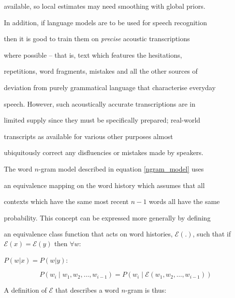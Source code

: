 available, so local estimates may need smoothing with global priors.


In addition, if language models are to be used for speech recognition


then it is good to train them on {\it precise} acoustic transcriptions


where possible -- that is, text which features the hesitations,


repetitions, word fragments, mistakes and all the other sources of


deviation from purely grammatical language that characterise everyday


speech. However, such acoustically accurate transcriptions are in


limited supply since they must be specifically prepared; real-world


transcripts as available for various other purposes almost


ubiquitously correct any disfluencies or mistakes made by speakers.










The word $n$-gram model described in equation \ref{ngram_model} uses


an equivalence mapping on the word history which assumes that all


contexts which have the same most recent $n-1$ words all have the same


probability. This concept can be expressed more generally by defining


an equivalence class function that acts on word histories, $\mathcal


E(.)$, such that if $\mathcal E(x) = \mathcal E(y)$ then $\forall w:$


$P(w | x) = P(w | y)$:


\begin{equation}


P(w_i \;|\; w_1, w_2, \ldots, w_{i-1}) =


P(w_i \;|\; \mathcal E(w_1, w_2, \ldots, w_{i-1}))\label{equiv_cond_prob_model}


\end{equation}





A definition of $\mathcal{E}$ that describes a word $n$-gram is thus:


